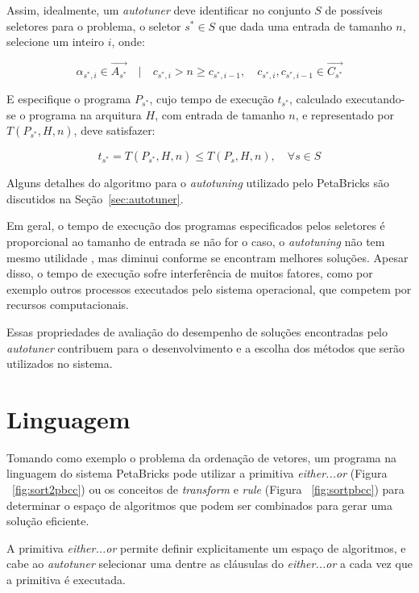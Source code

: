 \documentclass[a4paper, 11pt, twoside]{article}
\begin{document}
Assim, idealmente, um \emph{autotuner} deve identificar no conjunto $S$ de
possíveis seletores para o problema, o seletor $s^* \in S$ que dada uma 
entrada de tamanho $n$, selecione um inteiro $i$, onde:

\begin{equation*}
    \alpha_{s^*,i} \in \overrightarrow{A_{s^*}} \quad | \quad c_{s^*,i} > n \geq c_{s^*,i-1},\quad
    c_{s^*,i}, c_{s^*,i-1} \in \overrightarrow{C_{s^*}}
\end{equation*}

E especifique o programa $P_{s^*}$, cujo tempo de execução $t_{s^*}$, calculado
executando-se o programa na arquitura $H$, com entrada de tamanho $n$, e
representado por $T(P_{s^*},H,n)$, deve satisfazer:

\begin{equation*}
    t_{s^*} = T(P_{s^*},H,n) \leq T(P_s,H,n), \quad \forall s \in S
\end{equation*}

Alguns detalhes do algoritmo para o \emph{autotuning} utilizado pelo PetaBricks
são discutidos na Seção~\ref{sec:autotuner}.

Em geral, o tempo de execução dos programas especificados pelos seletores
é proporcional ao tamanho de entrada \textemdash se não for o caso, o
\emph{autotuning} não tem mesmo utilidade \textemdash, mas diminui conforme
se encontram melhores soluções. Apesar disso, o tempo de execução sofre
interferência de muitos fatores, como por exemplo outros processos executados
pelo sistema operacional, que competem por recursos computacionais.

Essas propriedades de avaliação do desempenho de soluções encontradas pelo
\emph{autotuner} contribuem para o desenvolvimento e a escolha dos métodos
que serão utilizados no sistema.

\section{Linguagem}

Tomando como exemplo o problema da ordenação de vetores, um programa na
linguagem do sistema PetaBricks pode utilizar a primitiva \emph{either...or} 
(Figura ~\ref{fig:sort2pbcc}) ou os conceitos de \emph{transform} e \emph{rule}
(Figura ~\ref{fig:sortpbcc}) para determinar o espaço de algoritmos que podem 
ser combinados para gerar uma solução eficiente.

A primitiva \emph{either...or} permite definir explicitamente um espaço
de algoritmos, e cabe ao \emph{autotuner} selecionar uma dentre as cláusulas
do \emph{either...or} a cada vez que a primitiva é executada.
\end{document}
